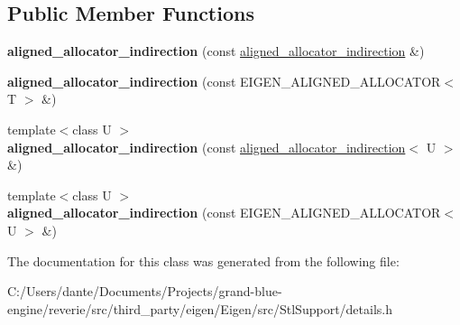 \subsection*{Public Member Functions}
\begin{DoxyCompactItemize}
\item 
\mbox{\label{class_eigen_1_1aligned__allocator__indirection_ac2516527cfcc701bf5f514c636aeb597}} 
{\bfseries aligned\+\_\+allocator\+\_\+indirection} (const \mbox{\hyperlink{class_eigen_1_1aligned__allocator__indirection}{aligned\+\_\+allocator\+\_\+indirection}} \&)
\item 
\mbox{\label{class_eigen_1_1aligned__allocator__indirection_aee11c7f6c62a3bee4c67d8d737cb016e}} 
{\bfseries aligned\+\_\+allocator\+\_\+indirection} (const E\+I\+G\+E\+N\+\_\+\+A\+L\+I\+G\+N\+E\+D\+\_\+\+A\+L\+L\+O\+C\+A\+T\+OR$<$ T $>$ \&)
\item 
\mbox{\label{class_eigen_1_1aligned__allocator__indirection_a1e6768d759dca2902bfaac420f145b37}} 
{\footnotesize template$<$class U $>$ }\\{\bfseries aligned\+\_\+allocator\+\_\+indirection} (const \mbox{\hyperlink{class_eigen_1_1aligned__allocator__indirection}{aligned\+\_\+allocator\+\_\+indirection}}$<$ U $>$ \&)
\item 
\mbox{\label{class_eigen_1_1aligned__allocator__indirection_aa47167e9b3924f7e05e4171685b6998e}} 
{\footnotesize template$<$class U $>$ }\\{\bfseries aligned\+\_\+allocator\+\_\+indirection} (const E\+I\+G\+E\+N\+\_\+\+A\+L\+I\+G\+N\+E\+D\+\_\+\+A\+L\+L\+O\+C\+A\+T\+OR$<$ U $>$ \&)
\end{DoxyCompactItemize}


The documentation for this class was generated from the following file\+:\begin{DoxyCompactItemize}
\item 
C\+:/\+Users/dante/\+Documents/\+Projects/grand-\/blue-\/engine/reverie/src/third\+\_\+party/eigen/\+Eigen/src/\+Stl\+Support/details.\+h\end{DoxyCompactItemize}
